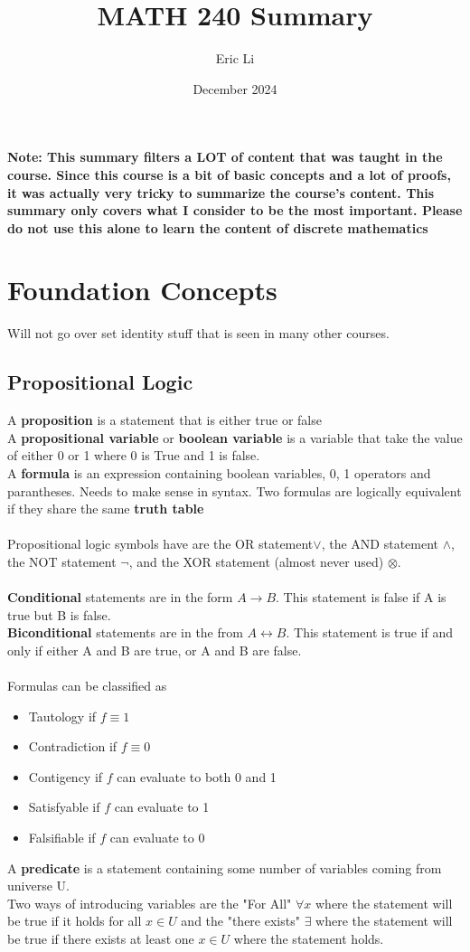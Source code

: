 \documentclass{article}
\title{MATH 240 Summary}
\author{Eric Li}
\date{December 2024}
\begin{document}
\maketitle

\textbf{Note: This summary filters a LOT of content that was taught in the course. Since this course is a bit of basic concepts and a lot of proofs, it was actually very tricky to summarize the course's content. This summary only covers what I consider to be the most important. Please do not use this alone to learn the content of discrete mathematics}


\section{Foundation Concepts}
Will not go over set identity stuff that is seen in many other courses.
\subsection{Propositional Logic}
A \textbf{proposition} is a statement that is either true or false\\
A \textbf{propositional variable} or \textbf{boolean variable} is a variable that take the value of either 0 or 1 where 0 is True and 1 is false.\\
A \textbf{formula} is an expression containing boolean variables, 0, 1 operators and parantheses. Needs to make sense in syntax. Two formulas are logically equivalent if they share the same \textbf{truth table}\\\\
Propositional logic symbols have are the OR statement$\vee$, the AND statement $\wedge$, the NOT statement $\neg$, and the XOR statement (almost never used) $\otimes$. \\\\
\textbf{Conditional} statements are in the form $A\rightarrow B$. This statement is false if A is true but B is false.\\
\textbf{Biconditional} statements are in the from $A\leftrightarrow B$. This statement is true if and only if either A and B are true, or A and B are false.\\\\
Formulas can be classified as
\begin{itemize}
    \item Tautology if $f\equiv1$
    \item Contradiction if $f\equiv 0$
    \item Contigency if $f$ can evaluate to both 0 and 1
    \item Satisfyable if $f$ can evaluate to 1
    \item Falsifiable if $f$ can evaluate to 0
\end{itemize}
A \textbf{predicate} is a statement containing some number of variables coming from universe U.\\
Two ways of introducing variables are the "For All" $\forall x$ where the statement will be true if it holds for all $x\in U$ and the "there exists" $\exists$ where the statement will be true if there exists at least one $x\in U$ where the statement holds.
\end{document}
